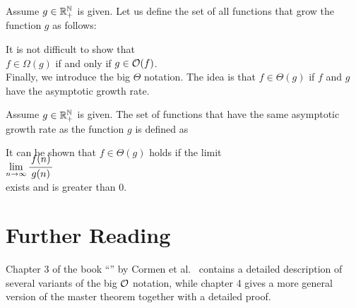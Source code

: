 \begin{Definition}[$\Omega(g)$] 
  Assume $g \in {\mathbb R}_+^{{\mathbb N}}$ is given.   Let us define the set of all functions that grow 
   the function $g$ as follows:
  \\[0.2cm]
  \hspace*{0.5cm} 
  \colorbox{red}{}
  \eox
\end{Definition}
It is not difficult to show that
\\[0.2cm]
\hspace*{1.3cm}
 $f \in \Omega(g)$ \quad if and only if \quad $g \in \mathcal{O}(f)$.
\\[0.2cm]
Finally, we introduce the big $\Theta$ notation.  The idea is that $f \in \Theta(g)$ if 
$f$ and $g$ have the  asymptotic growth rate. 

\begin{Definition}[$\Theta(g)$] 
  Assume $g \in {\mathbb R}_+^{{\mathbb N}}$ is given.   The set of functions that have the same asymptotic growth rate
  as the function $g$ is defined as
  \\[0.2cm]
  \hspace*{0.5cm} 
  \colorbox{red}{}
  \eox 
\end{Definition}

\noindent
It can be shown that $f \in \Theta(g)$ holds if the limit
\\[0.4cm]
\hspace*{1.3cm}
$\lim\limits_{n \rightarrow \infty} \bruch{f(n)}{g(n)}$
\\[0.2cm]
exists and is greater than $0$.


\section{Further Reading}
Chapter 3 of the book ``'' by Cormen et al.~\cite{cormen:09}
contains a detailed description of several variants of the big $\mathcal{O}$ notation, while
chapter 4 gives a more general version of the master theorem together with a detailed proof.


